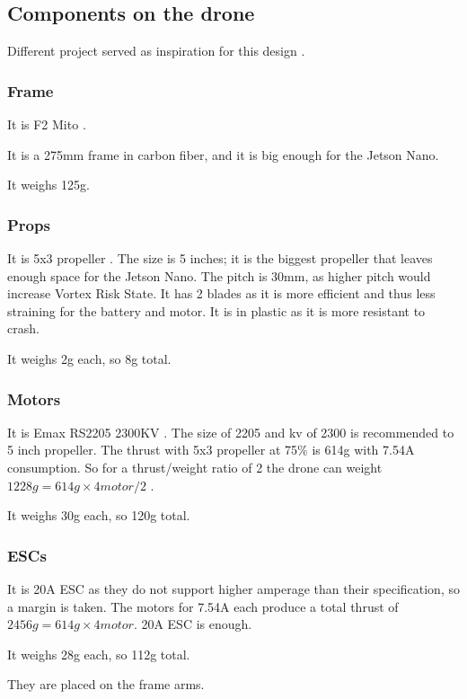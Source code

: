 \subsection{Components on the drone}

Different project served as inspiration for this design \cite{hackaday_navio} \cite{instructables_navio}.

\subsubsection{Frame}
It is F2 Mito \cite{bangood_f2_mito}.

It is a 275mm frame in carbon fiber, and it is big enough for the Jetson Nano.

It weighs 125g.

\subsubsection{Props}
It is 5x3 propeller \cite{bangood_propeller}. The size is 5 inches; it is the biggest propeller that leaves enough space for the Jetson Nano. The pitch is 30mm, as higher pitch would increase Vortex Risk State. It has 2 blades as it is more efficient and thus less straining for the battery and motor. It is in plastic as it is more resistant to crash.

It weighs 2g each, so 8g total.

\subsubsection{Motors}
It is Emax RS2205 2300KV \cite{bangood_motor}. The size of 2205 and kv of 2300 is recommended to 5 inch propeller. The thrust with 5x3 propeller at 75\% is 614g with 7.54A consumption. So for a thrust/weight ratio of 2 the drone can weight $1228g=614g \times 4motor / 2$ \cite{google_sheets_motor}.

It weighs 30g each, so 120g total.

\subsubsection{ESCs}
It is 20A ESC \cite{bangood_esc} as they do not support higher amperage than their specification, so a margin is taken. The motors for 7.54A each produce a total thrust of $2456g=614g\times 4motor$. 20A ESC is enough.

It weighs 28g each, so 112g total.

They are placed on the frame arms.

